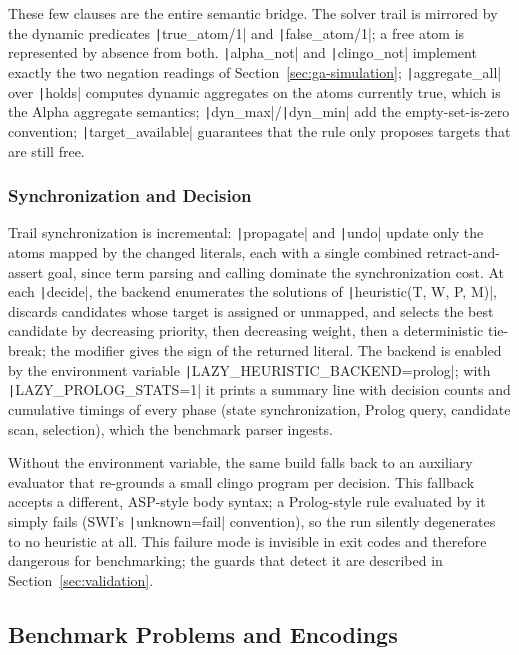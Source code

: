 These few clauses are the entire semantic bridge. The solver trail is mirrored by the dynamic predicates \texttt|true_atom/1| and \texttt|false_atom/1|; a free atom is represented by absence from both. \texttt|alpha_not| and \texttt|clingo_not| implement exactly the two negation readings of Section~\ref{sec:ga-simulation}; \texttt|aggregate_all| over \texttt|holds| computes dynamic aggregates on the atoms currently true, which is the Alpha aggregate semantics; \texttt|dyn_max|/\texttt|dyn_min| add the empty-set-is-zero convention; \texttt|target_available| guarantees that the rule only proposes targets that are still free.

\subsubsection{Synchronization and Decision}

Trail synchronization is incremental: \texttt|propagate| and \texttt|undo| update only the atoms mapped by the changed literals, each with a single combined retract-and-assert goal, since term parsing and calling dominate the synchronization cost. At each \texttt|decide|, the backend enumerates the solutions of \texttt|heuristic(T, W, P, M)|, discards candidates whose target is assigned or unmapped, and selects the best candidate by decreasing priority, then decreasing weight, then a deterministic tie-break; the modifier gives the sign of the returned literal. The backend is enabled by the environment variable \texttt|LAZY_HEURISTIC_BACKEND=prolog|; with \texttt|LAZY_PROLOG_STATS=1| it prints a summary line with decision counts and cumulative timings of every phase (state synchronization, Prolog query, candidate scan, selection), which the benchmark parser ingests.

Without the environment variable, the same build falls back to an auxiliary evaluator that re-grounds a small clingo program per decision. This fallback accepts a different, ASP-style body syntax; a Prolog-style rule evaluated by it simply fails (SWI's \texttt|unknown=fail| convention), so the run silently degenerates to no heuristic at all. This failure mode is invisible in exit codes and therefore dangerous for benchmarking; the guards that detect it are described in Section~\ref{sec:validation}.

\subsection{Benchmark Problems and Encodings}

